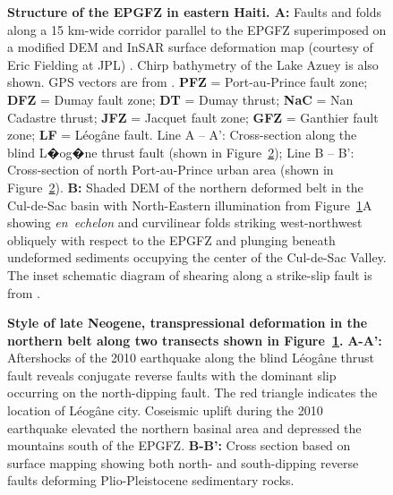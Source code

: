 \documentclass[linenumbers,draft]{agujournal}
\begin{document}
\begin{figure}
\centering
\caption{\textbf{Structure of the EPGFZ in eastern Haiti. A:} Faults and folds along a 15 km-wide corridor parallel to the EPGFZ superimposed on a modified DEM and InSAR surface deformation map (courtesy of Eric Fielding at JPL) \citep{hayes2010complex}. Chirp bathymetry of the Lake Azuey is also shown. GPS vectors are from \citet{calais2010transpressional}. \textbf{PFZ} = Port-au-Prince fault zone; \textbf{DFZ} = Dumay fault zone; \textbf{DT} = Dumay thrust; \textbf{NaC} = Nan Cadastre thrust; \textbf{JFZ} = Jacquet fault zone; \textbf{GFZ} = Ganthier fault zone; \textbf{LF} = L\'eog\^ane fault. Line A -- A': Cross-section along the blind L�og�ne thrust fault (shown in Figure~\ref{figure3}); Line B -- B': Cross-section of north Port-au-Prince urban area (shown in Figure~\ref{figure3}). \textbf{B:} Shaded DEM of the northern deformed belt in the Cul-de-Sac basin with North-Eastern illumination from Figure~\ref{figure2}A showing \textit{en~echelon} and curvilinear folds striking west-northwest obliquely with respect to the EPGFZ and plunging beneath undeformed sediments occupying the center of the Cul-de-Sac Valley. The inset schematic diagram of shearing along a strike-slip fault is from \citet{odonne1983analogue}.}
\label{figure2}
\end{figure}

\begin{figure}
\centering
\caption{\textbf{Style of late Neogene, transpressional deformation in the northern belt along two transects shown in Figure~\ref{figure2}.} \textbf{A-A':} Aftershocks of the 2010 earthquake \citep{douilly2013crustal,douilly2015three} along the blind L\'eog\^ane thrust fault reveals conjugate reverse faults with the dominant slip occurring on the north-dipping fault. The red triangle indicates the location of L\'eog\^ane city. Coseismic uplift during the 2010 earthquake elevated the northern basinal area and depressed the mountains south of the EPGFZ. \textbf{B-B':} Cross section based on surface mapping \citep{bachhuber2010,rathje2011damage,cox2011shear,mchugh2011offshore,saint2015seismotectonics} showing both north- and south-dipping reverse faults deforming Plio-Pleistocene sedimentary rocks.}
\label{figure3}
\end{figure}
\end{document}
